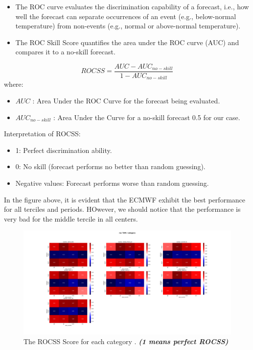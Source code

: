 \begin{itemize}
	\item The ROC curve evaluates the discrimination capability of a forecast, i.e., how well the forecast can separate occurrences of an event (e.g., below-normal temperature) from non-events (e.g., normal or above-normal temperature).
	\item The ROC Skill Score quantifies the area under the ROC curve (AUC) and compares it to a no-skill forecast.
\end{itemize}

	$$ROCSS=\frac{AUC-AUC_{no-skill}}{1-AUC_{no-skill}}$$
where:
\begin{itemize}
	\item $AUC$ : Area Under the ROC Curve for the forecast being evaluated.
	\item $AUC_{no-skill}$ : Area Under the Curve for a no-skill forecast 0.5 for our case.
\end{itemize}

Interpretation of ROCSS:
\begin{itemize}
	\item 1: Perfect discrimination ability.
	\item 0: No skill (forecast performs no better than random guessing).
	\item Negative values: Forecast performs worse than random guessing.
\end{itemize}
	

In the figure above, it is evident that the ECMWF exhibit the best performance for all terciles and periods. HOwever, we should notice that the performance is very bad for the middle tercile in all centers.

\begin{figure}[H]
    \centering
    \includegraphics[scale=0.25]{roc_T2M_category.png}
    \caption{The ROCSS Score for each category  . \textbf{\textit{(1 means perfect ROCSS)}}}
\end{figure}


